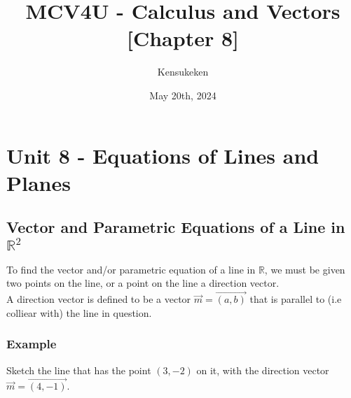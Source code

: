 \documentclass{article}
\title{MCV4U - Calculus and Vectors [Chapter 8]}
\author{Kensukeken}
\date{May 20th, 2024}
\begin{document}
\maketitle

\tableofcontents
\newpage
\section{Unit 8 - Equations of Lines and Planes }
\subsection{Vector and Parametric Equations of a Line in $\mathbb{R}^2$}
To find the vector and/or parametric equation of a line in $\mathbb{R}$, we must be given two points on the line, or a point on the line a direction vector.\\
A direction vector is defined to be a vector $\vec{m}=\overrightarrow{(a,b)}$ that is parallel to (i.e colliear with) the line in question.

\subsubsection*{Example}
\begin{minipage}{0.45\textwidth}
    Sketch the line that has the point $(3,-2)$ on it, with the direction vector $\vec{m}=\overrightarrow{(4,-1)}$.
\end{minipage}%
\begin{minipage}{0.45\textwidth}
    \begin{center}
    \end{center}
\end{minipage}
\end{document}
